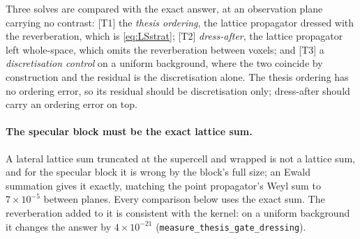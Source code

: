 \documentclass[11pt,a4paper]{article}
\begin{document}
Three solves are compared with the exact answer, at an observation plane carrying no contrast:
[T1] the \emph{thesis ordering}, the lattice propagator dressed with the reverberation, which is
\eqref{eq:LSstrat}; [T2] \emph{dress-after}, the lattice propagator left whole-space, which omits
the reverberation between voxels; and [T3] a \emph{discretisation control} on a uniform background,
where the two coincide by construction and the residual is the discretisation alone. The thesis
ordering has no ordering error, so its residual should be discretisation only; dress-after should
carry an ordering error on top.

\paragraph{The specular block must be the exact lattice sum.} A lateral lattice sum truncated at
the supercell and wrapped is not a lattice sum, and for the specular block it is wrong by the
block's full size; an Ewald summation gives it exactly, matching the point propagator's Weyl sum to
$7\times10^{-5}$ between planes. Every comparison below uses the exact sum. The reverberation added
to it is consistent with the kernel: on a uniform background it changes the answer by
$4\times10^{-21}$ (\texttt{measure\_thesis\_gate\_dressing}).
\end{document}

